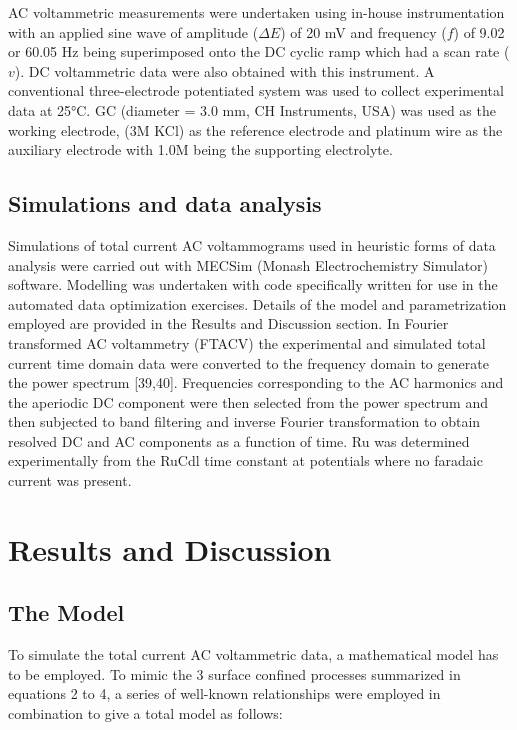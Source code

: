 \documentclass[a4paper, 12pt]{article}
\begin{document}
AC voltammetric measurements were undertaken using in-house instrumentation with 
an applied sine wave of amplitude ($\Delta E$) of 20 mV and frequency ($f$) of 
9.02 or 60.05 Hz being superimposed onto the DC cyclic ramp which had a scan 
rate ($v$).   DC voltammetric data were also obtained with this instrument. A 
conventional three-electrode potentiated system was used to collect experimental 
data at 25°C.  GC (diameter = 3.0 mm, CH Instruments, USA) was used as the 
working electrode,
 (3M KCl) as the reference electrode and platinum wire as the auxiliary electrode with 1.0M  being the supporting electrolyte.

\subsection{Simulations and data analysis}


Simulations of total current AC voltammograms used in heuristic forms of data 
analysis were carried out with MECSim (Monash Electrochemistry Simulator) 
software. Modelling was undertaken with code specifically written for use in the 
automated data optimization exercises. Details of the model and parametrization 
employed are provided in the Results and Discussion section.  In Fourier 
transformed  AC voltammetry (FTACV) the experimental and simulated total current 
time domain data were converted to the frequency domain to generate the power 
spectrum [39,40]. Frequencies corresponding to the AC harmonics and the 
aperiodic DC component were then selected from the power spectrum and then 
subjected to band filtering and inverse Fourier transformation to obtain 
resolved DC and AC components as a function of time. Ru was determined 
experimentally from the RuCdl time constant at potentials where no faradaic 
current was present.

\section{Results and Discussion}

\subsection{The Model}


To simulate the total current AC voltammetric data, a mathematical model has to 
be employed. To mimic the 3 surface confined processes summarized in equations 2 
to 4, a series of well-known relationships were employed in combination to give 
a total model as follows:
\end{document}
